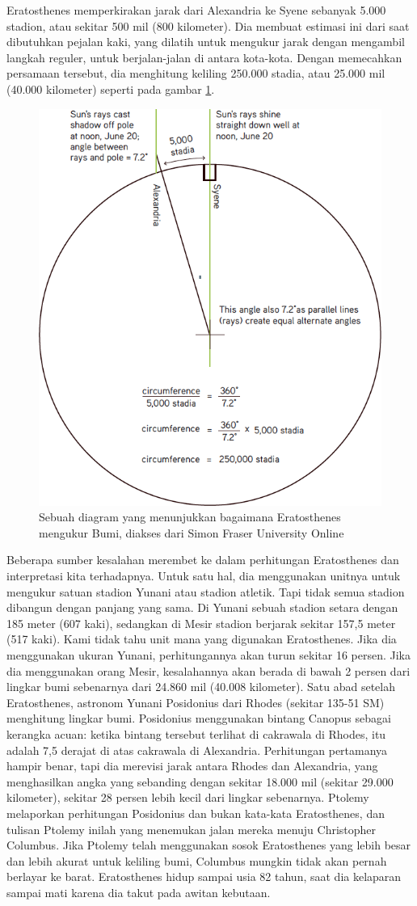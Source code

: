 Eratosthenes memperkirakan jarak dari Alexandria ke Syene sebanyak 5.000 stadion, atau sekitar 500 mil (800 kilometer). Dia membuat estimasi ini dari saat dibutuhkan pejalan kaki, yang dilatih untuk mengukur jarak dengan mengambil langkah reguler, untuk berjalan-jalan di antara kota-kota. Dengan memecahkan persamaan tersebut, dia menghitung keliling 250.000 stadia, atau 25.000 mil (40.000 kilometer) seperti pada gambar \ref{diagrampengukuranbumi}.
\begin{figure}[ht]
	\centerline{\includegraphics[width=.5\textwidth]{figures/diagrampengukuranbumi.png}}
	\caption{Sebuah diagram yang menunjukkan bagaimana Eratosthenes mengukur Bumi, diakses dari Simon Fraser University Online}
	\label{diagrampengukuranbumi}
	\end{figure}
Beberapa sumber kesalahan merembet ke dalam perhitungan Eratosthenes dan interpretasi kita terhadapnya. Untuk satu hal, dia menggunakan unitnya untuk mengukur satuan stadion Yunani atau stadion atletik. Tapi tidak semua stadion dibangun dengan panjang yang sama. Di Yunani sebuah stadion setara dengan 185 meter (607 kaki), sedangkan di Mesir stadion berjarak sekitar 157,5 meter (517 kaki). Kami tidak tahu unit mana yang digunakan Eratosthenes. Jika dia menggunakan ukuran Yunani, perhitungannya akan turun sekitar 16 persen. Jika dia menggunakan orang Mesir, kesalahannya akan berada di bawah 2 persen dari lingkar bumi sebenarnya dari 24.860 mil (40.008 kilometer).
Satu abad setelah Eratosthenes, astronom Yunani Posidonius dari Rhodes (sekitar 135-51 SM) menghitung lingkar bumi. Posidonius menggunakan bintang Canopus sebagai kerangka acuan: ketika bintang tersebut terlihat di cakrawala di Rhodes, itu adalah 7,5 derajat di atas cakrawala di Alexandria. Perhitungan pertamanya hampir benar, tapi dia merevisi jarak antara Rhodes dan Alexandria, yang menghasilkan angka yang sebanding dengan sekitar 18.000 mil (sekitar 29.000 kilometer), sekitar 28 persen lebih kecil dari lingkar sebenarnya. Ptolemy melaporkan perhitungan Posidonius dan bukan kata-kata Eratosthenes, dan tulisan Ptolemy inilah yang menemukan jalan mereka menuju Christopher Columbus. Jika Ptolemy telah menggunakan sosok Eratosthenes yang lebih besar dan lebih akurat untuk keliling bumi, Columbus mungkin tidak akan pernah berlayar ke barat.
Eratosthenes hidup sampai usia 82 tahun, saat dia kelaparan sampai mati karena dia takut pada awitan kebutaan.
